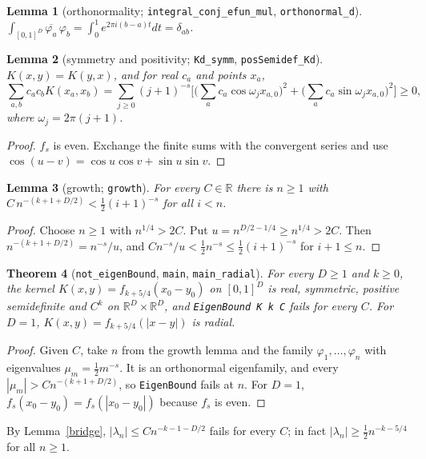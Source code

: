 \documentclass[11pt]{article}
\newtheorem{theorem}{Theorem}
\newtheorem{lemma}[theorem]{Lemma}
\theoremstyle{definition}
\theoremstyle{remark}
\begin{document}
\begin{lemma}[orthonormality; \texttt{integral\_conj\_efun\_mul}, \texttt{orthonormal\_d}]
$\int_{[0,1]^D}\overline{\varphi_a}\,\varphi_b=\int_0^1e^{2\pi i(b-a)t}dt=\delta_{ab}$.
\end{lemma}

\begin{lemma}[symmetry and positivity; \texttt{Kd\_symm}, \texttt{posSemidef\_Kd}]
$K(x,y)=K(y,x)$, and for real $c_a$ and points $x_a$,
\[
  \sum_{a,b}c_ac_bK(x_a,x_b)=\sum_{j\ge0}(j+1)^{-s}\Big[\Big(\sum_ac_a\cos\omega_jx_{a,0}\Big)^2
  +\Big(\sum_ac_a\sin\omega_jx_{a,0}\Big)^2\Big]\ge0,
\]
where $\omega_j=2\pi(j+1)$.
\end{lemma}
\begin{proof}
$f_s$ is even. Exchange the finite sums with the convergent series and use
$\cos(u-v)=\cos u\cos v+\sin u\sin v$.
\end{proof}

\begin{lemma}[growth; \texttt{growth}]
For every $C\in\mathbb R$ there is $n\ge1$ with $C\,n^{-(k+1+D/2)}<\tfrac12(i+1)^{-s}$ for all $i<n$.
\end{lemma}
\begin{proof}
Choose $n\ge1$ with $n^{1/4}>2C$. Put $u=n^{D/2-1/4}\ge n^{1/4}>2C$. Then
$n^{-(k+1+D/2)}=n^{-s}/u$, and $Cn^{-s}/u<\tfrac12n^{-s}\le\tfrac12(i+1)^{-s}$ for $i+1\le n$.
\end{proof}

\begin{theorem}[\texttt{not\_eigenBound}, \texttt{main}, \texttt{main\_radial}]
For every $D\ge1$ and $k\ge0$, the kernel $K(x,y)=f_{k+5/4}(x_0-y_0)$ on $[0,1]^D$ is real,
symmetric, positive semidefinite and $C^k$ on $\mathbb R^D\times\mathbb R^D$, and
\texttt{EigenBound K k C} fails for every $C$. For $D=1$, $K(x,y)=f_{k+5/4}(|x-y|)$ is radial.
\end{theorem}
\begin{proof}
Given $C$, take $n$ from the growth lemma and the family $\varphi_1,\dots,\varphi_n$ with eigenvalues
$\mu_m=\tfrac12m^{-s}$. It is an orthonormal eigenfamily, and every $|\mu_m|>Cn^{-(k+1+D/2)}$, so
\texttt{EigenBound} fails at $n$. For $D=1$, $f_s(x_0-y_0)=f_s(|x_0-y_0|)$ because $f_s$ is even.
\end{proof}

By Lemma~\ref{bridge}, $|\lambda_n|\le Cn^{-k-1-D/2}$ fails for every $C$; in fact
$|\lambda_n|\ge\tfrac12n^{-k-5/4}$ for all $n\ge 1$.
\end{document}
